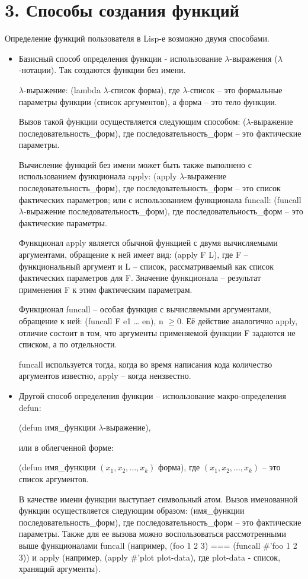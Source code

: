 \documentclass[12pt]{report}
\begin{document}
\section*{3. Способы создания функций}

Определение функций пользователя в Lisp-е возможно двумя способами.


\begin{itemize}
	\item Базисный способ  определения  функции - использование $\lambda$-выражения ($\lambda$-нотации). Так создаются функции без имени.
	
	$\lambda$-выражение: (lambda $\lambda$-список форма), 
	где $\lambda$-список --  это формальные параметры функции (список аргументов), а форма -- это тело функции.
	
	Вызов такой функции осуществляется следующим способом: ($\lambda$-выражение последовательность\_форм), 
	где последовательность\_форм -- это фактические параметры.
	
	Вычисление функций без имени может быть также выполнено с использованием функционала apply: (apply $\lambda$-выражение последовательность\_форм), где последовательность\_форм -- это список фактических параметров; или с использованием функционала funcall: (funcall $\lambda$-выражение последовательность\_форм), где последовательность\_форм -- это фактические параметры.
	
	Функционал apply является обычной функцией с двумя  вычисляемыми аргументами, обращение к ней имеет вид: (apply F L), где F – функциональный аргумент и L -- список, рассматриваемый как список фактических параметров для F. Значение функционала -- результат применения F к этим фактическим параметрам.
	
	Функционал funcall – особая функция с вычисляемыми аргументами, обращение к ней: (funcall F e1 … en), n $\geqslant 0$. Её   действие аналогично apply, отличие состоит в том, что аргументы  применяемой функции F задаются не списком, а по отдельности. 
	
	funcall используется тогда, когда во время написания кода количество аргументов известно, apply -- когда неизвестно.
	
	\item Другой способ определения функции -- использование макро-определения defun: 
	
	(defun имя\_функции $\lambda$-выражение), 
	
	или  в облегченной форме:
	
	(defun имя\_функции $(x_1, x_2, ..., x_k)$ форма), 
	где $(x_1, x_2, ..., x_k)$ -- это  список аргументов.
	
	В качестве имени функции выступает символьный атом. 
	Вызов именованной функции осуществляется следующим образом: (имя\_функции последовательность\_форм), 
	где последовательность\_форм -- это фактические параметры.
	Также для ее вызова можно воспользоваться рассмотренными выше функционалами funcall (например, (foo 1 2 3) === (funcall \#'foo 1 2 3)) и apply (например, (apply \#'plot plot-data), где plot-data - список, хранящий аргументы).
	
\end{itemize}
\end{document}
